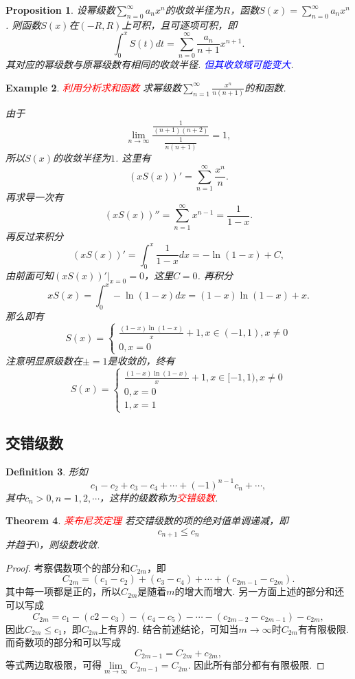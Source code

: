 \documentclass{article}
\newtheorem{theorem}{Theorem}[section]
\newtheorem{proposition}[theorem]{Proposition}
\newtheorem{example}[theorem]{Example}
\newtheorem{definition}[theorem]{Definition}
\newcommand{\redt}[1]{\textcolor{red}{#1}}
\newcommand{\bluet}[1]{\textcolor{blue}{#1}}
\begin{document}
\begin{proposition}
\rm 设幂级数$\sum\limits_{n=0}^{\infty}a_nx^n$的收敛半径为$R$，函数$S(x) = \sum\limits_{n=0}^{\infty}a_nx^n$. 则函数$S(x)$在$(-R,R)$上可积，且可逐项可积，即
$$
\int_0^x S(t)dt  = \sum\limits_{n=0}^{\infty} \frac{a_n}{n+1}x^{n+1}.
$$
其对应的幂级数与原幂级数有相同的收敛半径. \bluet{但其收敛域可能变大}.
\end{proposition}

\begin{example}
\rm \redt{利用分析求和函数} 求幂级数$\sum\limits_{n=1}^{\infty} \frac{x^n}{n(n+1)}$的和函数. 

由于
$$
\lim\limits_{n \to \infty} \frac{\frac{1}{(n+1)(n+2)}}{\frac{1}{n(n+1)}} = 1,
$$
所以$S(x)$的收敛半径为$1$. 这里有
$$
(xS(x))' = \sum\limits_{n=1}^{\infty} \frac{x^n}{n}.
$$
再求导一次有
$$
(xS(x))'' = \sum\limits_{n=1}^{\infty} x^{n-1} = \frac{1}{1-x}. 
$$
再反过来积分
$$
(xS(x))'  = \int_0^{x} \frac{1}{1-x}dx = -\ln (1-x) + C,
$$
由前面可知$(xS(x))'|_{x=0} = 0$，这里$C  = 0$. 再积分
$$
xS(x)  = \int_0^{x} -\ln(1-x)dx = (1-x)\ln(1-x)+x.
$$
那么即有
$$
S(x) = \left\{\begin{array}{ll}
\frac{(1-x)\ln (1-x)}{x} + 1, x \in (-1,1), x \neq 0 \\
0, x = 0
\end{array} \right.
$$
注意明显原级数在$\pm = 1$是收敛的，终有
$$
S(x) = \left\{\begin{array}{ll}
\frac{(1-x)\ln (1-x)}{x} + 1, x \in [-1,1), x \neq 0 \\
0, x = 0 \\
1, x = 1 
\end{array} \right.
$$
\end{example}

\subsection{交错级数}

\begin{definition}
\rm 形如
$$
c_1 - c_2 + c_3 - c_4 + \cdots + (-1)^{n-1}c_n + \cdots,
$$
其中$c_n > 0,n=1,2,\cdots$，这样的级数称为\redt{交错级数}.
\end{definition}

\begin{theorem}
\rm \redt{莱布尼茨定理} 若交错级数的项的绝对值单调递减，即
$$
c_{n+1} \leq c_n
$$
并趋于$0$，则级数收敛.
\end{theorem}

\begin{proof}
考察偶数项个的部分和$C_{2m}$，即
$$
C_{2m} = (c_1-c_2) + (c_3 - c_4) + \cdots + (c_{2m-1}-c_{2m}).
$$
其中每一项都是正的，所以$C_{2m}$是随着$m$的增大而增大. 另一方面上述的部分和还可以写成
$$
C_{2m} = c_1 - (c2-c_3) - (c_4-c_5) - \cdots - (c_{2m-2}-c_{2m-1}) - c_{2m},
$$
因此$C_{2m} \leq c_1$，即$C_{2m}$上有界的. 结合前述结论，可知当$m \to \infty$时$C_{2m}$有有限极限. 而奇数项的部分和可以写成
$$
C_{2m-1} = C_{2m} + c_{2m}, 
$$
等式两边取极限，可得$\lim\limits_{m \to \infty} C_{2m-1}=C_{2m}$.   因此所有部分都有有限极限. 
\end{proof}
\end{document}
